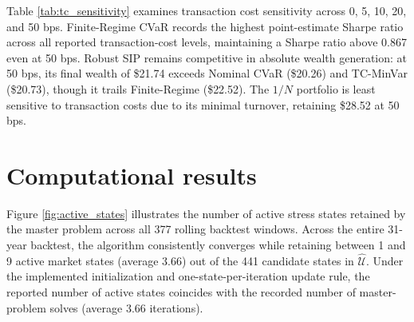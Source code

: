 \documentclass[smallextended]{svjour3}
\begin{document}
\begin{table}[htbp]
\centering
\caption{Transaction cost sensitivity: out-of-sample performance under alternative cost levels}
\label{tab:tc_sensitivity}
\end{table}

Table \ref{tab:tc_sensitivity} examines transaction cost sensitivity across 0, 5, 10, 20, and 50 bps. Finite-Regime CVaR records the highest point-estimate Sharpe ratio across all reported transaction-cost levels, maintaining a Sharpe ratio above 0.867 even at 50 bps. Robust SIP remains competitive in absolute wealth generation: at 50 bps, its final wealth of \$21.74 exceeds Nominal CVaR (\$20.26) and TC-MinVar (\$20.73), though it trails Finite-Regime (\$22.52). The $1/N$ portfolio is least sensitive to transaction costs due to its minimal turnover, retaining \$28.52 at 50 bps.

\section{Computational results}\label{sec:computational}
Figure \ref{fig:active_states} illustrates the number of active stress states retained by the master problem across all 377 rolling backtest windows. Across the entire 31-year backtest, the algorithm consistently converges while retaining between 1 and 9 active market states (average 3.66) out of the 441 candidate states in $\widehat{\mathcal{U}}$. Under the implemented initialization and one-state-per-iteration update rule, the reported number of active states coincides with the recorded number of master-problem solves (average 3.66 iterations).
\end{document}
